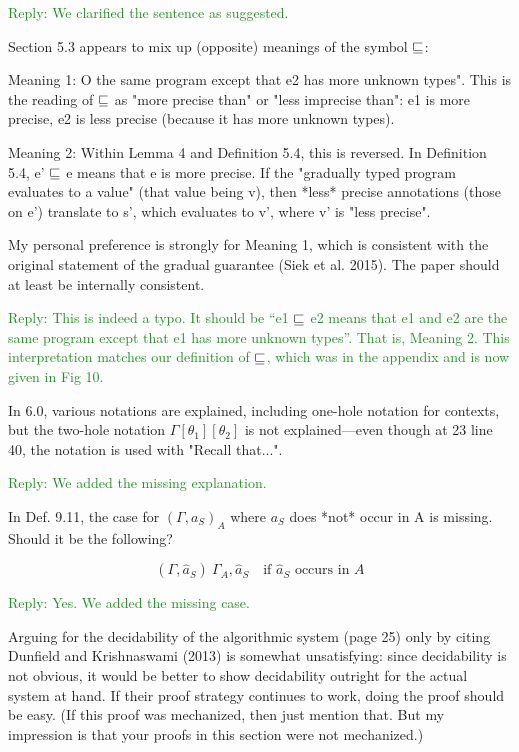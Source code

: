 \documentclass[dvipsnames]{article}
\newcommand\reply[1]{\textcolor{ForestGreen}{Reply: #1}}
\begin{document}
\reply{We clarified the sentence as suggested.}

Section 5.3 appears to mix up (opposite) meanings of the symbol $\sqsubseteq$:


Meaning 1: O
the same program except that e2 has more unknown types". This is the reading of
$\sqsubseteq$ as "more precise than" or "less imprecise than": e1 is more precise, e2 is
less precise (because it has more unknown types).

Meaning 2: Within Lemma 4 and Definition 5.4, this is reversed. In Definition
5.4, e' $\sqsubseteq$ e means that e is more precise. If the "gradually typed program
evaluates to a value" (that value being v), then *less* precise annotations
(those on e') translate to s', which evaluates to v', where v' is "less
precise".

My personal preference is strongly for Meaning 1, which is consistent with the
original statement of the gradual guarantee (Siek et al. 2015). The paper should
at least be internally consistent.

\reply{This is indeed a typo. It should be ``e1 $\sqsubseteq$ e2 means that e1 and e2
  are the same program except that e1 has more unknown types''. That is, Meaning
  2. This interpretation matches our definition of $\sqsubseteq$, which was in the
  appendix and is now given in Fig 10.}

In 6.0, various notations are explained, including one-hole notation for
contexts, but the two-hole notation $\Gamma[\theta_1][\theta_2]$ is not
explained---even though at 23 line 40, the notation is used with "Recall
that...".

\reply{We added the missing explanation.}

In Def. 9.11, the case for $(\Gamma, a_S)_A$ where $a_S$ does *not* occur in A
is missing. Should it be the following?

\[
  (\Gamma, \widehat{a}_S) \ \Gamma_A, \widehat{a}_S  \quad \text{if $\widehat{a}_S$ occurs in $A$}
\]

\reply{Yes. We added the missing case.}

Arguing for the decidability of the algorithmic system (page 25) only by citing
Dunfield and Krishnaswami (2013) is somewhat unsatisfying: since decidability is
not obvious, it would be better to show decidability outright for the actual
system at hand. If their proof strategy continues to work, doing the proof
should be easy. (If this proof was mechanized, then just mention that. But my
impression is that your proofs in this section were not mechanized.)
\end{document}

